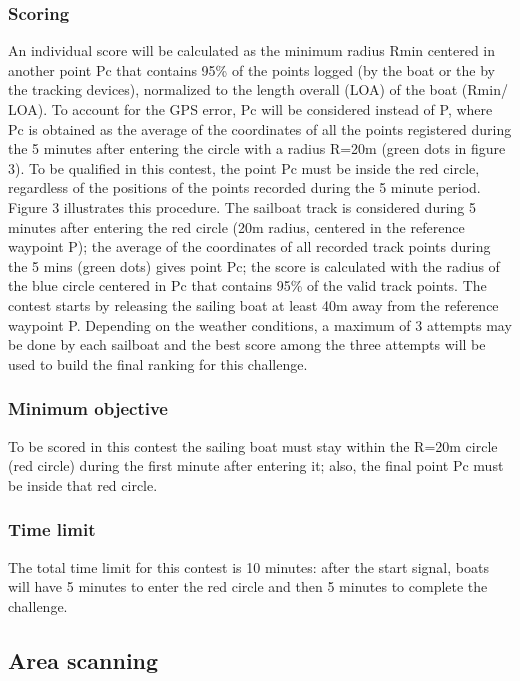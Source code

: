 \documentclass[12pt]{article}
\begin{document}
\subsubsection{Scoring}
An individual score will be calculated as the minimum radius Rmin centered in
another point Pc that contains 95\% of the points logged (by the boat or the by the tracking
devices), normalized to the length overall (LOA) of the boat (Rmin/ LOA). 
To account for the GPS error, Pc will be
considered instead of P, where Pc is obtained as the average of the coordinates
of all the points
registered during the 5 minutes after entering the circle with a radius R=20m
(green dots in
figure 3). To be qualified in this contest, the point Pc must be inside the red
circle, regardless
of the positions of the points recorded during the 5 minute period.
Figure 3 illustrates this procedure. The sailboat track is considered during 5
minutes after
entering the red circle (20m radius, centered in the reference waypoint P); the
average of the
coordinates of all recorded track points during the 5 mins (green dots) gives
point Pc; the score
is calculated with the radius of the blue circle centered in Pc that contains
95\% of the valid
track points. The contest starts by releasing the sailing boat at least 40m away
from the
reference waypoint P. Depending on the weather conditions, a maximum of 3
attempts may be
done by each sailboat and the best score among the three attempts will be used
to build the
final ranking for this challenge.
\subsubsection{Minimum objective}
To be scored in this contest the sailing boat must stay within the R=20m circle
(red circle)
during the first minute after entering it; also, the final point Pc must be
inside that red circle.
\subsubsection{Time limit}
The total time limit for this contest is 10 minutes: after the start signal,
boats will have 5
minutes to enter the red circle and then 5 minutes to complete the challenge.

\subsection{Area scanning}
\end{document}
